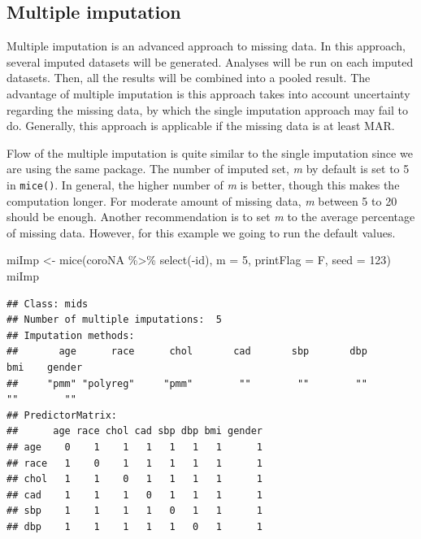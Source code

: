 \documentclass[
  10pt,
]{krantz}
\newenvironment{Shaded}{\begin{snugshade}}{\end{snugshade}}
\newcommand{\AttributeTok}[1]{\textcolor[rgb]{0.77,0.63,0.00}{#1}}
\newcommand{\DecValTok}[1]{\textcolor[rgb]{0.00,0.00,0.81}{#1}}
\newcommand{\FunctionTok}[1]{\textcolor[rgb]{0.00,0.00,0.00}{#1}}
\newcommand{\NormalTok}[1]{#1}
\newcommand{\OtherTok}[1]{\textcolor[rgb]{0.56,0.35,0.01}{#1}}
\newcommand{\SpecialCharTok}[1]{\textcolor[rgb]{0.00,0.00,0.00}{#1}}
\begin{document}
\hypertarget{multiple-imputation}{%
\subsection{\texorpdfstring{Multiple imputation}{Multiple imputation}}\label{multiple-imputation}}

Multiple imputation is an advanced approach to missing data. In this approach, several imputed datasets will be generated. Analyses will be run on each imputed datasets. Then, all the results will be combined into a pooled result. The advantage of multiple imputation is this approach takes into account uncertainty regarding the missing data, by which the single imputation approach may fail to do. Generally, this approach is applicable if the missing data is at least MAR.

Flow of the multiple imputation is quite similar to the single imputation since we are using the same package. The number of imputed set, \emph{m} by default is set to 5 in \texttt{mice()}. In general, the higher number of \emph{m} is better, though this makes the computation longer. For moderate amount of missing data, \emph{m} between 5 to 20 should be enough. Another recommendation is to set \emph{m} to the average percentage of missing data. However, for this example we going to run the default values.

\begin{Shaded}
\begin{Highlighting}[]
\NormalTok{miImp }\OtherTok{\textless{}{-}} \FunctionTok{mice}\NormalTok{(coroNA }\SpecialCharTok{\%\textgreater{}\%} \FunctionTok{select}\NormalTok{(}\SpecialCharTok{{-}}\NormalTok{id), }\AttributeTok{m =} \DecValTok{5}\NormalTok{, }\AttributeTok{printFlag =}\NormalTok{ F, }\AttributeTok{seed =} \DecValTok{123}\NormalTok{)}
\NormalTok{miImp}
\end{Highlighting}
\end{Shaded}

\begin{verbatim}
## Class: mids
## Number of multiple imputations:  5 
## Imputation methods:
##       age      race      chol       cad       sbp       dbp       bmi    gender 
##     "pmm" "polyreg"     "pmm"        ""        ""        ""        ""        "" 
## PredictorMatrix:
##      age race chol cad sbp dbp bmi gender
## age    0    1    1   1   1   1   1      1
## race   1    0    1   1   1   1   1      1
## chol   1    1    0   1   1   1   1      1
## cad    1    1    1   0   1   1   1      1
## sbp    1    1    1   1   0   1   1      1
## dbp    1    1    1   1   1   0   1      1
\end{verbatim}
\end{document}
